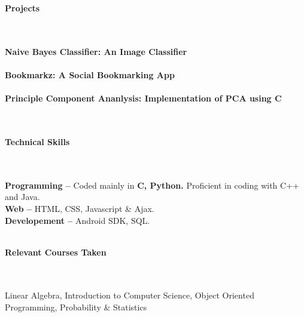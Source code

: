 \documentclass[a4paper,10pt]{article}
\newcommand{\lsep}{-0.5cm}
\newcommand{\resheading}[1]{{\large \colorbox{mygrey}{\begin{minipage}{0.99\textwidth}{\textbf{#1 \vphantom{p\^{E}}}}\end{minipage}}}}
\begin{document}
\resheading{\textbf{Projects} }\\\\[\lsep]

\indent\textbf{Naive Bayes Classifier: An Image Classifier}\\
\\

\indent\textbf{Bookmarkz: A Social Bookmarking App}\\
\\

\indent\textbf{Principle Component Ananlysis: Implementation of PCA using C}\\
\\\\


\resheading{\textbf{Technical Skills} }\\\\[\lsep]

\indent\textbf{Programming -- }Coded mainly in \textbf{C, Python.} Proficient in coding with C++ and Java.\\
\indent\textbf{Web -- } HTML, CSS, Javascript \& Ajax.\\
\indent\textbf{Developement --} Android SDK, SQL.\\\\


\resheading{\textbf{Relevant Courses Taken} }\\\\[\lsep]

\indent Linear Algebra, Introduction to Computer Science, Object Oriented Programming, Probability \& Statistics
\\\\
\end{document}
